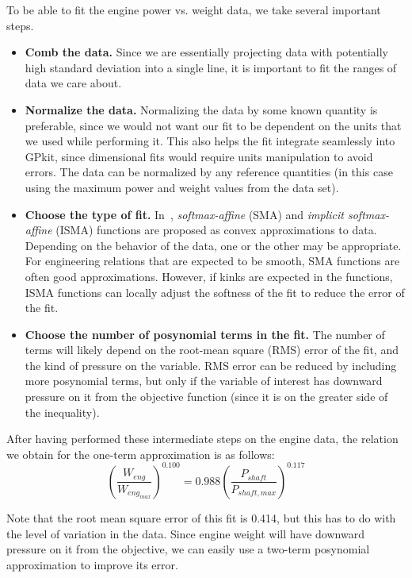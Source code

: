 To be able to fit the engine power vs. weight data, we take several important steps.
\begin{itemize}
    \item \textbf{Comb the data.} Since we are essentially projecting
    data with potentially high standard deviation into a single line,
    it is important to fit the ranges of data we care about.
    \item \textbf{Normalize the data.} Normalizing the data
	by some known quantity is preferable, since we would not want our fit to be dependent on the
	units that we used while performing it. This also helps the fit integrate
    seamlessly into GPkit, since dimensional fits would require units manipulation
    to avoid errors. The data can be normalized by any
    reference quantities (in this case using the maximum power and weight values
    from the data set).
    \item \textbf{Choose the type of fit.} In~\cite{gpfitpaper}, \textit{softmax-affine}
    (SMA) and \textit{implicit softmax-affine} (ISMA)
    functions are proposed as convex approximations
    to data. Depending on the behavior of the data, one or the other
    may be appropriate. For engineering relations that are expected to be smooth, SMA
    functions are often good approximations. However, if kinks are expected in the
    functions, ISMA functions can locally adjust the softness of the fit to
    reduce the error of the fit.
    \item \textbf{Choose the number of posynomial terms in the fit.} The number of
    terms will likely depend on the root-mean square (RMS) error of the fit, and
    the kind of pressure on the variable. RMS error can be reduced by including
    more posynomial terms, but only if the variable of interest has downward
    pressure on it from the objective function (since it is on the greater side
    of the inequality).
\end{itemize}

After having performed these intermediate steps on the engine data,
the relation we obtain for the one-term approximation is as follows:
\begin{equation}
	(\frac{W_{eng}}{W_{eng_{max}}})^{0.100} = 0.988 (\frac{P_{shaft}}{P_{shaft,max}})^{0.117}
\end{equation}

Note that the root mean square error of this fit is 0.414, but this has to do with 
the level of variation in the data. Since engine weight will have downward pressure
on it from the objective, we can easily use a two-term posynomial approximation to 
improve its error. 

